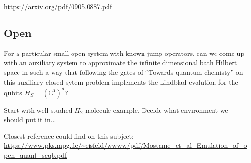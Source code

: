 \documentclass[11pt]{article}
\theoremstyle{change}
\theoremstyle{nonumberplain}
\numberwithin{equation}{section}
\begin{document}
\url{https://arxiv.org/pdf/0905.0887.pdf}

\subsection{Open}

For a particular small open system with known jump operators, can we come up with an auxiliary system to approximate the infinite dimensional bath Hilbert space in such a way that following the gates of ``Towards quantum chemisty'' on this auxiliary closed sytem problem implements the Lindblad evolution for the qubits $H_S = (\mathbb{C}^2)^d$?

Start with well studied $H_2$ molecule example. Decide what environment we should put it in...

Closest reference could find on this subject:
\url{https://www.pks.mpg.de/~eisfeld/wwww/pdf/Mostame_et_al_Emulation_of_open_quant_scqb.pdf}
\end{document}
